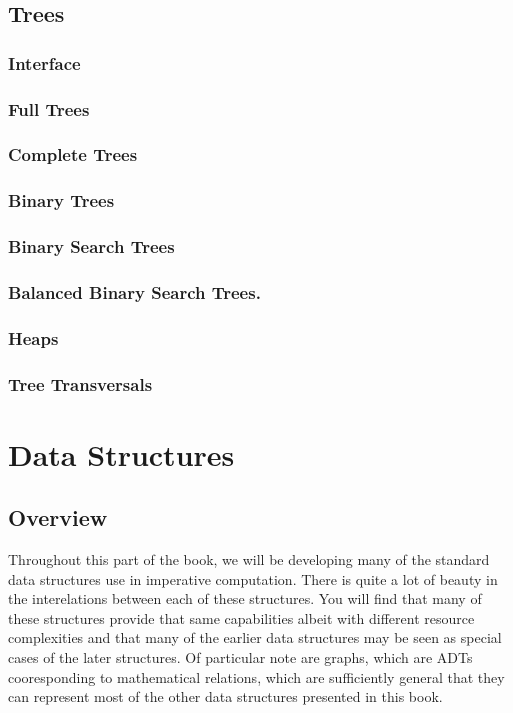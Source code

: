 \documentclass[12pt, letterpaper]{book}
\begin{document}
\section{Trees}
	\subsection{Interface}
	\subsection{Full Trees}
	\subsection{Complete Trees}
	\subsection{Binary Trees}
	\subsection{Binary Search Trees}
	\subsection{Balanced Binary Search Trees.}
	\subsection{Heaps}
	\subsection{Tree Transversals} \label{Tree Transversals}

\chapter{Data Structures}

\section[Overview]{Overview}

Throughout this part of the book, we will be developing many of the standard data structures use in imperative computation. There is quite a lot of beauty in the interelations between each of these structures. You will find that many of these structures provide that same capabilities albeit with different resource complexities and that many of the earlier data structures may be seen as special cases of the later structures. Of particular note are graphs, which are ADTs cooresponding to mathematical relations, which are sufficiently general that they can represent most of the other data structures presented in this book.
\end{document}
